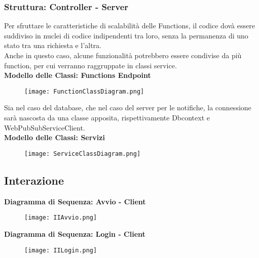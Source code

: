 \subsubsection{Struttura: Controller - Server}
Per sfruttare le caratteristiche di scalabilità delle Functions, il codice dovà essere suddiviso in nuclei di codice indipendenti tra loro, senza la permanenza di uno stato tra una richiesta e l'altra.\\
Anche in questo caso, alcune funzionalità potrebbero essere condivise da più function, per cui verranno raggruppate in classi service.\\
\textbf{Modello delle Classi: Functions Endpoint}\\
\begin{figure}[h!]
    \begin{center}
        \texttt{[image: FunctionClassDiagram.png]}
    \end{center}
\end{figure}
\clearpage
Sia nel caso del database, che nel caso del server per le notifiche, la connessione sarà nascosta da una classe apposita, rispettivamente Dbcontext e WebPubSubServiceClient.\\
\textbf{Modello delle Classi: Servizi}\\
\begin{figure}[h!]
    \begin{center}
        \texttt{[image: ServiceClassDiagram.png]}
    \end{center}
\end{figure}

\clearpage
\subsection{Interazione}

\textbf{Diagramma di Sequenza: Avvio - Client}\\
\begin{figure}[h!]
    \begin{center}
        \texttt{[image: IIAvvio.png]}
    \end{center}
\end{figure}

\textbf{Diagramma di Sequenza: Login - Client}\\
\begin{figure}[h!]
    \begin{center}
        \texttt{[image: IILogin.png]}
    \end{center}
\end{figure}
\clearpage

